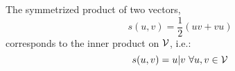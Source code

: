 \begin{lemma}\label{l:inner-product}
	The symmetrized product of two vectors, \[s(u,v) = \frac{1}{2}(uv + vu)\] corresponds to the inner product on $\mathcal{V}$, i.e.: \[s(u,v) = u|v \ \forall u,v \in \mathcal{V}\]
\end{lemma}
